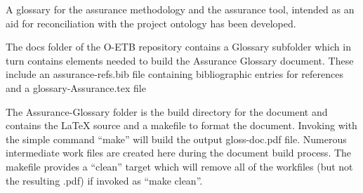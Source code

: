 \documentclass[12pt,twoside,a4paper]{article}
\begin{document}
A glossary for the assurance methodology and the assurance tool, intended as an aid for reconciliation with the project ontology has been developed.

The docs folder of the O-ETB repository contains a Glossary subfolder which in turn contains elements needed to build the Assurance Glossary document. These include an assurance-refs.bib file containing bibliographic entries for references and a glossary-Assurance.tex file

The Assurance-Glossary folder is the build directory for the document and contains the LaTeX source and a makefile to format the document. Invoking with the simple command ``make'' will build the output gloss-doc.pdf file. Numerous intermediate work files are created here during the document build process. The makefile provides a ``clean'' target which will remove all of the workfiles (but not the resulting .pdf) if invoked as ``make clean''.


\clearpage



%
\clearpage
\end{document}

